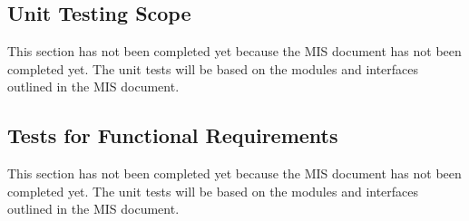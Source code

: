 \documentclass[12pt, titlepage]{article}
\begin{document}
\subsection{Unit Testing Scope}

This section has not been completed yet because the MIS document has not been
completed yet. The unit tests will be based on the modules and interfaces
outlined in the MIS document.


\subsection{Tests for Functional Requirements}

This section has not been completed yet because the MIS document has not been
completed yet. The unit tests will be based on the modules and interfaces
outlined in the MIS document.






					
					
					
\end{document}
